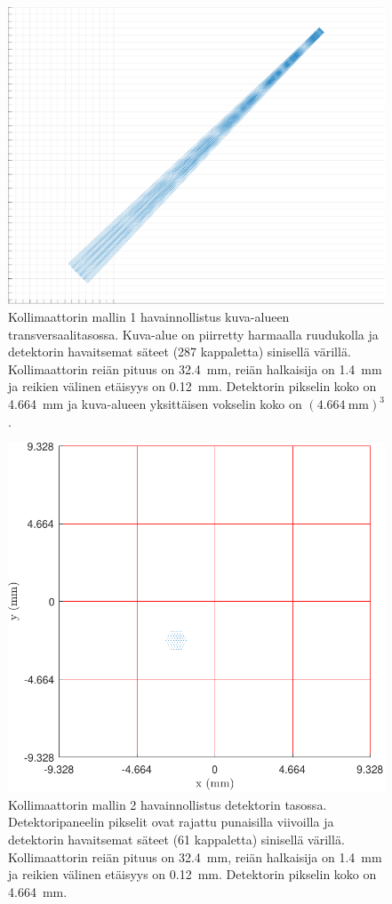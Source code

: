 \begin{figure}[H]
    \centering
    \captionsetup{width=.9\linewidth}
    \includegraphics[width=.9\linewidth]{kuvat/malli1_3D.pdf}
    \caption{Kollimaattorin mallin 1 havainnollistus kuva-alueen transversaalitasossa. Kuva-alue on piirretty harmaalla ruudukolla ja detektorin havaitsemat säteet (287 kappaletta) sinisellä värillä. Kollimaattorin reiän pituus on \qty{32.4}{\milli\meter}, reiän halkaisija on \qty{1.4}{\milli\meter} ja reikien välinen etäisyys on \qty{0.12}{\milli\meter}. Detektorin pikselin koko on \qty{4.664}{\milli\meter} ja kuva-alueen yksittäisen vokselin koko on $(\qty{4.664}{\milli\meter})^{3}$.}
    \label{fig:ray1_3D}
\end{figure}
\begin{figure}[H]
    \centering
    \captionsetup{width=.9\linewidth}
    \includegraphics[width=.9\linewidth]{kuvat/malli2_2D.pdf}
    \caption{Kollimaattorin mallin 2 havainnollistus detektorin tasossa. Detektoripaneelin pikselit ovat rajattu punaisilla viivoilla ja detektorin havaitsemat säteet (61 kappaletta) sinisellä värillä. Kollimaattorin reiän pituus on \qty{32.4}{\milli\meter}, reiän halkaisija on \qty{1.4}{\milli\meter} ja reikien välinen etäisyys on \qty{0.12}{\milli\meter}. Detektorin pikselin koko on \qty{4.664}{\milli\meter}.}
    \label{fig:ray2_2D}
\end{figure}
